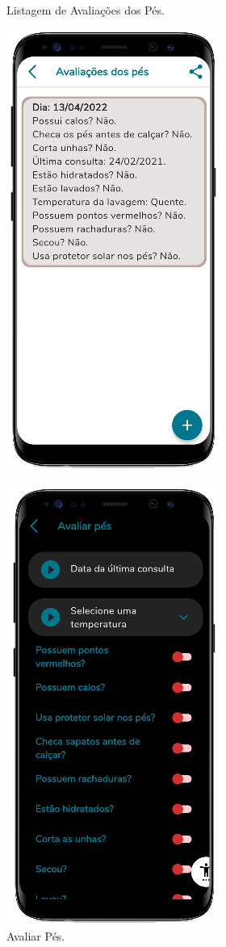 \begin{figure}[htb]
    \centering
    \begin{minipage}{0.47\textwidth}
        \centering
        \caption{Listagem de Avaliações dos Pés.}\label{fig_list_ava_pes}
        \includegraphics[scale=0.66]{Imagens/desenvolvimento/app/list_ava_pes.png}
    \end{minipage}
    \hfill
    \begin{minipage}{0.45\textwidth}
        \centering
        \caption{Avaliar Pés.}\label{fig_reg_ava_pes}
        \includegraphics[scale=0.66]{Imagens/desenvolvimento/app/reg_ava_pes.png}

\end{minipage}
\end{figure}
